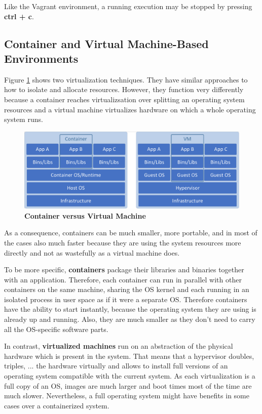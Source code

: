 Like the Vagrant environment, a running execution may be stopped by pressing \textbf{ctrl + c}.

\subsection{Container and Virtual Machine-Based Environments}
Figure \ref{fig:docker-env-container-vs-vm} shows two virtualization techniques. They have similar approaches to how to isolate and allocate resources. However, they function very differently because a container reaches virtualizsation over splitting an operating system resources and a virtual machine virtualizes hardware on which a whole operating system runs.

\begin{figure}[htbp]
  \centering
  \includegraphics[width=1.0\textwidth, clip, trim=1mm 1mm 1mm 1mm]{Figures/container_vs_vm}
  \caption{\bf\small Container versus Virtual Machine}
  \label{fig:docker-env-container-vs-vm}
\end{figure}

As a consequence, containers can be much smaller, more portable, and in most of the cases also much faster because they are using the system resources more directly and not as wastefully as a virtual machine does.

To be more specific, \textbf{containers} package their libraries and binaries together with an application. Therefore, each container can run in parallel with other containers on the same machine, sharing the OS kernel and each running in an isolated process in user space as if it were a separate OS. Therefore containers have the ability to start instantly, because the operating system they are using is already up and running. Also, they are much smaller as they don't need to carry all the OS-specific software parts.

In contrast, \textbf{virtualized machines} run on an abstraction of the physical hardware which is present in the system. That means that a hypervisor doubles, triples, ... the hardware virtually and allows to install full versions of an operating system compatible with the current system. As each virtualization is a full copy of an OS, images are much larger and boot times most of the time are much slower. Nevertheless, a full operating system might have benefits in some cases over a containerized system.


